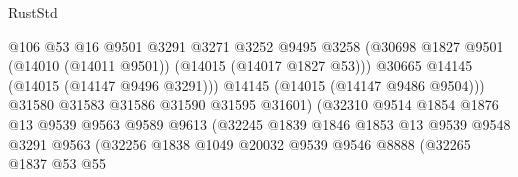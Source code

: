 \begin{lexlean}{RustStd}
\begin{coremodule}
                                          @106
                                          @53
                                          @16
                                          @9501
                                          @3291
                                          @3271
                                          @3252
                                          @9495
                                          @3258
                                          (@30698
                                            @1827
                                            @9501
                                            (@14010 (@14011 @9501))
                                            (@14015 (@14017 @1827 @53)))
                                          @30665
                                          @14145
                                          (@14015 (@14147 @9496 @3291)))
                                        @14145
                                        (@14015 (@14147 @9486 @9504)))
                                      @31580
                                      @31583
                                      @31586
                                      @31590
                                      @31595
                                      @31601)
                                    (@32310
                                      @9514
                                      @1854
                                      @1876
                                      @13
                                      @9539
                                      @9563
                                      @9589
                                      @9613
                                      (@32245
                                        @1839
                                        @1846
                                        @1853
                                        @13
                                        @9539
                                        @9548
                                        @3291
                                        @9563
                                        (@32256
                                          @1838
                                          @1049
                                          @20032
                                          @9539
                                          @9546
                                          @8888
                                          (@32265
                                            @1837
                                            @53
                                            @55

\end{coremodule}
\end{lexlean}
